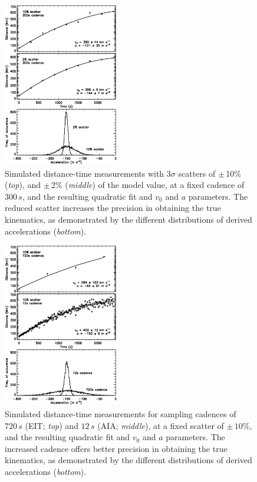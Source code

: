 \documentclass[structabstract]{aa}
\begin{document}
\begin{figure}[!t]
\begin{center}
\includegraphics[width = 0.45\textwidth]{images/noise_hist_weight.eps}
\caption{Simulated distance-time measurements with 3$\sigma$ scatters of $\pm$\,10\% (\emph{top}), and $\pm$\,2\% (\emph{middle}) of the model value, at a fixed cadence of $300\,s$, and the resulting quadratic fit and $v_0$ and $a$ parameters. The reduced scatter increases the precision in obtaining the true kinematics, as demonstrated by the different distributions of derived accelerations (\emph{bottom}).}
\label{noise_hist_weight}
\end{center}
\end{figure}

\begin{figure}[!t]
\begin{center}
\includegraphics[width = 0.45\textwidth]{images/cad_hist_weight.eps}
\caption{Simulated distance-time measurements for sampling cadences of $720\,s$ (EIT; \emph{top}) and $12\,s$ (AIA; \emph{middle}), at a fixed scatter of $\pm\,10\%$, and the resulting quadratic fit and $v_0$ and $a$ parameters. The increased cadence offers better precision in obtaining the true kinematics, as demonstrated by the different distributions of derived accelerations (\emph{bottom}).}
\label{cad_hist_weight}
\end{center}
\end{figure}
\end{document}
